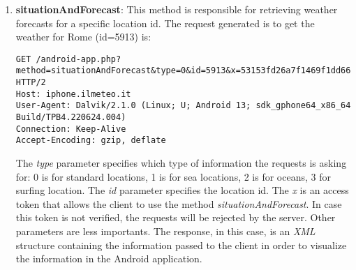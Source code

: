 \begin{enumerate}
\begin{lstlisting}
INSERT INTO "n_l" VALUES(1,'PD','VEN','IT','Abano Terme',0,1,'Abano Terme','35031',19726, 45.36, 11.79, 14, -1 );
INSERT INTO "n_l" VALUES(3328,'RM','LAZ','IT','Guidonia Montecelio',0,0,'Guidonia Montecelio','00012',83736, 41.99, 12.72, 105, -1 );
INSERT INTO "n_l" VALUES(279,'LT','LAZ','IT','Aprilia',0,0,'Aprilia','04011',70349, 41.59, 12.65, 80, -1 );
\end{lstlisting}
						The final database will be queried by the mobile application when the user will direcly type in the location he wants to know the forecast about. The database is stored on the devices in the file \textit{/data/data/com.ilmeteo.android.ilmeteo/databases/ilmeteo.db}. Each place has an ID location, denoted as \textit{lid}, that will be used to retrieve forecasts for that location. In the listing above, Abano Terme has lid=1, Guidonia Montecelio has lid=3328, Aprilia has lid=279. Notice that the response body does not contains only places near the user location. In the 35 thousands lines there are the cities from the whole world.
					\item \textbf{situationAndForecast}: This method is responsible for retrieving weather forecasts for a specific location id. The request generated is to get the weather for Rome (id=5913) is:
\begin{lstlisting}
GET /android-app.php?method=situationAndForecast&type=0&id=5913&x=53153fd26a7f1469f1dd669a3dde06f0&lang=eng&v=4.6&app=com.ilmeteo.android.ilmeteo&force_3h=0 HTTP/2
Host: iphone.ilmeteo.it
User-Agent: Dalvik/2.1.0 (Linux; U; Android 13; sdk_gphone64_x86_64 Build/TPB4.220624.004)
Connection: Keep-Alive
Accept-Encoding: gzip, deflate
\end{lstlisting}	
					The \textit{type} parameter specifies which type of information the requests is asking for: 0 is for standard locations, 1 is for sea locations, 2 is for oceans, 3 for surfing location. \newline
					The \textit{id} parameter specifies the location id.\newline
					The \textit{x} is an access token that allows the client to use the method \textit{situationAndForecast}. In case this token is not verified, the requests will be rejected by the server.\newline
					Other parameters are less importants. 
					The response, in this case, is an \textit{XML} structure containing the information passed to the client in order to visualize the information in the Android application.
				\end{enumerate}
				
